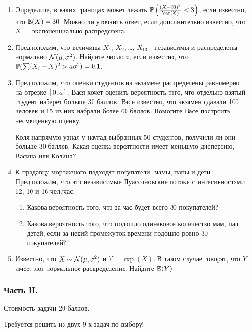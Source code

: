 \begin{enumerate}
\item Определите, в каких границах может лежать $\P\left(\frac{(X - 30)^{2}}{\Var(X)}
<3\right)$, если известно, что $\E(X)=30$. Можно ли уточнить ответ, если дополнительно
известно, что $X$ — экспоненциально распределена.

\item Предположим, что величины $X_{1}$, $X_{2}$, \ldots, $X_{13}$ - независимы и
распределены нормально $\cN(\mu,\sigma^{2})$. Найдите число $a$, если известно,
что $\P(\sum (X_{i} - \bar{X})^{2} > a\sigma^{2}) = 0.1$.
\item Предположим, что оценки студентов на экзамене распределены равномерно на отрезке
$[0;a]$. Вася хочет оценить вероятность того, что отдельно взятый студент наберет
больше 30 баллов. Васе известно, что экзамен сдавали 100 человек и 15 из них набрали
более 60 баллов. Помогите Васе построить несмещенную оценку.

Коля напрямую узнал у наугад выбранных 50 студентов, получили ли они больше 30 баллов.
Какая оценка вероятности имеет меньшую дисперсию, Васина или Колина?


\item К продавцу мороженого подходят покупатели: мамы, папы и дети. Предположим,
что это независимые Пуассоновские потоки с интесивностями 12, 10 и 16 чел/час.
\begin{enumerate}
\item Какова вероятность того, что за час будет всего 30 покупателей?
\item Какова вероятность того, что подошло одинаковое количество мам, пап детей,
если за некий промежуток времени подошло ровно 30 покупателей?
\end{enumerate}

\item Известно, что $X\sim \cN(\mu,\sigma^{2})$ и $Y=\exp(X)$. В таком случае
говорят, что $Y$ имеет лог-нормальное распределение. Найдите $\E(Y)$.
\end{enumerate}


\subsubsection*{Часть II.}

Стоимость задачи 20 баллов.

Требуется решить \textbf{} из двух 9-х задач по выбору!

